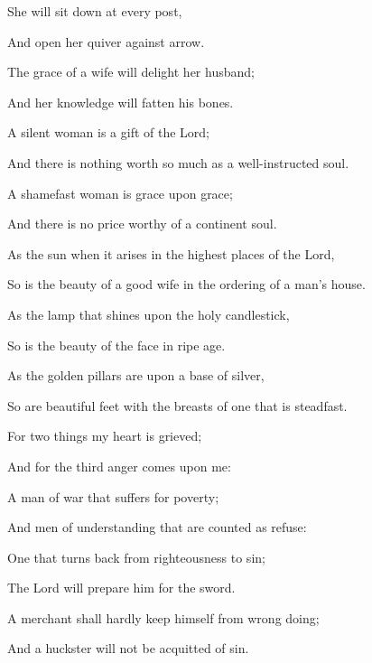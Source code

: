 {\par }{\Q She will sit down at every post,
\par }{\Q And open her quiver against
{} arrow.
\par }{\BB \par }{\Q {}The grace of a wife will delight her husband;
\par }{\Q And her knowledge will fatten his bones.
\par }{\Q {}A silent woman is a gift of the Lord;
\par }{\Q And there is nothing worth so much as a well-instructed soul.
\par }{\Q {}A shamefast woman is grace upon grace;
\par }{\Q And there is no
 price worthy of a continent soul.
\par }{\Q {}As the sun when it arises in the highest places of the Lord,
\par }{\Q So is the beauty of a good wife in the ordering of
 a man’s house.
\par }{\Q {}As the lamp that shines upon the holy candlestick,
\par }{\Q So is the beauty of the face in ripe age.
\par }{\Q {}As the golden pillars are upon a base of silver,
\par }{\Q So are beautiful feet with the breasts of one that is steadfast.
\par }{\BB \par }{\Q {}For two things my heart is grieved;
\par }{\Q And for the third anger comes upon me:
\par }{\Q A man of war that suffers for poverty;
\par }{\Q And men of understanding that are counted as refuse:
\par }{\Q One that turns back from righteousness to sin;
\par }{\Q The Lord will prepare him for the sword.
\par }{\BB \par }{\Q {}A merchant shall hardly keep himself from wrong doing;
\par }{\Q And a huckster will not be acquitted of sin.

}
